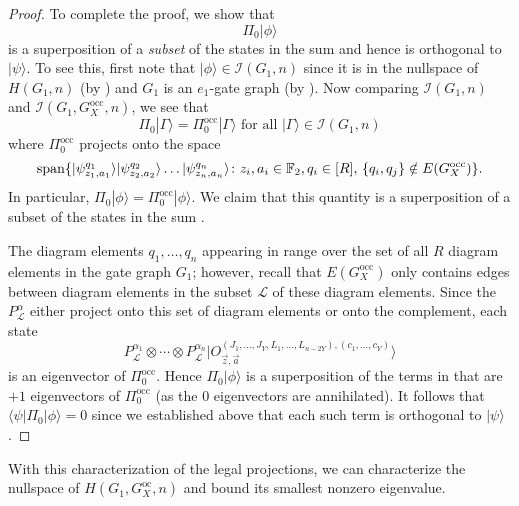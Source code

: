 \documentclass[../thesis-main/thesis-main]{subfiles}
\begin{document}
\begin{proof}
To complete the proof, we show that 
\begin{equation}
  \Pi_{0}|\phi\rangle
\end{equation}
is a superposition of a \emph{subset} of the states in the sum  and hence is orthogonal to $|\psi\rangle$. To see this, first note that $|\phi\rangle\in \mathcal{I}(G_1,n)$ since it is in the nullspace of $H(G_1,n)$ (by ) and $G_1$ is an $e_1$-gate graph (by ). Now comparing $\mathcal{I}(G_1,n)$ and $\mathcal{I}(G_1,G_X^{\text{occ}},n)$, we see that 
\begin{equation}
  \Pi_0 |\Gamma\rangle=\Pi_0^{{\text{occ}}} |\Gamma\rangle \text{ for all }|\Gamma\rangle\in \mathcal{I}(G_1,n)
\end{equation}
where $\Pi_0^{\text{occ}}$ projects onto the space
\begin{equation}
\operatorname{span}\{|\psi_{z_1,a_1}^{q_1}\rangle |\psi_{z_2,a_2}^{q_2}\rangle\ldots|\psi_{z_n,a_n}^{q_n}\rangle\colon z_i,a_i \in\mathbb{F}_2,	q_i\in [R],\, \{q_i,q_j\}\notin E(G_X^{\text{occ}})\}.\label{eq:hatpi}
\end{equation}
In particular, $\Pi_0 |\phi\rangle=\Pi_0^{\text{occ}} |\phi\rangle$. We claim that this quantity is a superposition of a subset of the states in the sum .

The diagram elements $q_1,\ldots,q_n$ appearing in  range over the set of all $R$ diagram elements in the gate graph $G_1$; however, recall that $E(G_X^{\text{occ}})$ only contains edges between diagram elements in the subset $\mathcal{L}$ of these diagram elements. Since the $P_{\mathcal{L}}^\alpha$  either project onto this set of diagram elements or onto the complement, each state 
\begin{equation}
  P_{\mathcal{L}}^{\alpha_{1}}\otimes \cdots\otimes P_{\mathcal{L}}^{\alpha_{n}}|O_{\vec{z},\vec{a}}^{(J_{1},\ldots,J_{Y},L_{1},\ldots,L_{n-2Y}),(c_{1},\ldots,c_{Y})}\rangle
\end{equation}
is an eigenvector of $\Pi_{0}^{{\text{occ}}}$.
Hence  $\Pi_0 |\phi\rangle$  is a superposition of the terms in  that are $+1$ eigenvectors of  $\Pi_0^{{\text{occ}}}$ (as the 0 eigenvectors are annihilated). It follows that $\langle \psi |\Pi_0 |\phi\rangle=0$ since we established above that each such term is orthogonal to $|\psi\rangle$.
\end{proof}

With this characterization of the legal projections, we can characterize the nullspace of $H(G_{1},G_X^{\text{oc}},n)$ and bound its smallest nonzero eigenvalue.
\end{document}
